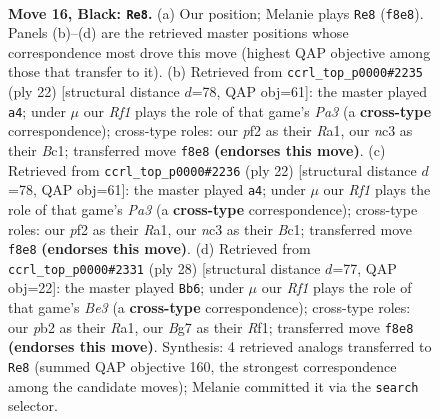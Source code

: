 \documentclass[11pt]{article}
\begin{document}
\clearpage

\begin{figure}[p]\centering
\begin{subfigure}{0.46\textwidth}\centering
\resizebox{\linewidth}{!}{%
\newchessgame
\chessboard[
  setfen={r1bq1r1k/pp1pppbp/3n4/2Q5/2P5/2N2N2/PP1P1PBP/R1B2RK1 b - - 0 16},
  showmover=false,
  pgfstyle=straightmove, color=movearrow, markmove={f8-e8}
]}
\caption{}
\end{subfigure}\hfill
\begin{subfigure}{0.46\textwidth}\centering
\resizebox{\linewidth}{!}{%
\newchessgame
\chessboard[
  setfen={r1b2rk1/pp1n1ppp/4pn2/8/3Nq3/P1P5/P3BPPP/R1BQ1RK1 w - - 1 12},
  showmover=false,
  pgfstyle=straightmove, color=movearrow, markmove={a3-a4}
]}
\caption{}
\end{subfigure}
\\[4pt]
\begin{subfigure}{0.46\textwidth}\centering
\resizebox{\linewidth}{!}{%
\newchessgame
\chessboard[
  setfen={r1b2rk1/pp1n1ppp/4pn2/8/3Nq3/P1P5/P3BPPP/R1BQ1RK1 w - - 1 12},
  showmover=false,
  pgfstyle=straightmove, color=movearrow, markmove={a3-a4}
]}
\caption{}
\end{subfigure}\hfill
\begin{subfigure}{0.46\textwidth}\centering
\resizebox{\linewidth}{!}{%
\newchessgame
\chessboard[
  setfen={r1b2rk1/1pq1b1pp/p3pn2/3p4/5P2/2N1B3/PPP1BQPP/R4R1K w - - 0 15},
  showmover=false,
  pgfstyle=straightmove, color=movearrow, markmove={e3-b6}
]}
\caption{}
\end{subfigure}
\caption{\textbf{Move 16, Black: \texttt{Re8}.} (a) Our position; Melanie plays \texttt{Re8} (\texttt{f8e8}). Panels (b)--(d) are the retrieved master positions whose correspondence most drove this move (highest QAP objective among those that transfer to it). (b) Retrieved from \texttt{ccrl\_top\_p0000\#2235} (ply 22) [structural distance $d$=78, QAP obj=61]: the master played \texttt{a4}; under $\mu$ our \emph{Rf1} plays the role of that game's \emph{Pa3} (a \textbf{cross-type} correspondence); cross-type roles: our \emph{p}f2 as their \emph{R}a1, our \emph{n}c3 as their \emph{B}c1; transferred move \texttt{f8e8} \textbf{(endorses this move)}. (c) Retrieved from \texttt{ccrl\_top\_p0000\#2236} (ply 22) [structural distance $d$=78, QAP obj=61]: the master played \texttt{a4}; under $\mu$ our \emph{Rf1} plays the role of that game's \emph{Pa3} (a \textbf{cross-type} correspondence); cross-type roles: our \emph{p}f2 as their \emph{R}a1, our \emph{n}c3 as their \emph{B}c1; transferred move \texttt{f8e8} \textbf{(endorses this move)}. (d) Retrieved from \texttt{ccrl\_top\_p0000\#2331} (ply 28) [structural distance $d$=77, QAP obj=22]: the master played \texttt{Bb6}; under $\mu$ our \emph{Rf1} plays the role of that game's \emph{Be3} (a \textbf{cross-type} correspondence); cross-type roles: our \emph{p}b2 as their \emph{R}a1, our \emph{B}g7 as their \emph{R}f1; transferred move \texttt{f8e8} \textbf{(endorses this move)}. Synthesis: 4 retrieved analogs transferred to \texttt{Re8} (summed QAP objective 160, the strongest correspondence among the candidate moves); Melanie committed it via the \texttt{search} selector.}
\label{fig:thought-m31}
\end{figure}
\end{document}
